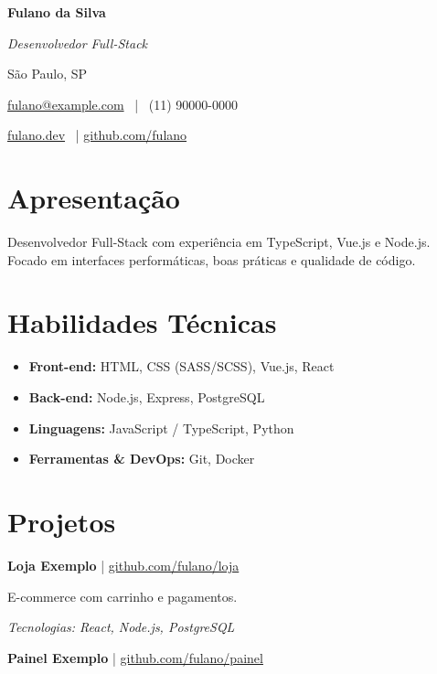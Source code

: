 \documentclass[a4paper,10pt]{article}
\begin{document}
\begin{center}
    {\LARGE \textbf{Fulano da Silva}}

    \textit{Desenvolvedor Full-Stack}

    São Paulo, SP

    \href{mailto:fulano@example.com}{fulano@example.com} \ | \ (11) 90000-0000

    \href{https://fulano.dev}{fulano.dev} \ |
    \href{https://github.com/fulano}{github.com/fulano}
\end{center}

\vspace{8pt}

\section*{Apresentação}
Desenvolvedor Full-Stack com experiência em TypeScript, Vue.js e Node.js.
Focado em interfaces performáticas, boas práticas e qualidade de código.

\section*{Habilidades Técnicas}

\begin{itemize}[leftmargin=*, itemsep=4pt]
    \item \textbf{Front-end:} HTML, CSS (SASS/SCSS), Vue.js, React
    \item \textbf{Back-end:} Node.js, Express, PostgreSQL
    \item \textbf{Linguagens:} JavaScript / TypeScript, Python
    \item \textbf{Ferramentas \& DevOps:} Git, Docker
\end{itemize}

\section*{Projetos}

\textbf{Loja Exemplo} | \href{https://github.com/fulano/loja}{github.com/fulano/loja}

E-commerce com carrinho e pagamentos.

\textit{Tecnologias: React, Node.js, PostgreSQL}

\vspace{6pt}

\textbf{Painel Exemplo} | \href{https://github.com/fulano/painel}{github.com/fulano/painel}
\end{document}
